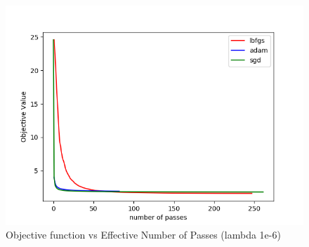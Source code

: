 \documentclass[11pt]{report}
\begin{document}
\begin{figure}[b]
\centering
\includegraphics[scale=0.4]{objval_ef_1e6.png}
\caption{Objective function vs Effective Number of Passes (lambda 1e-6)}
\end{figure}
\end{document}
